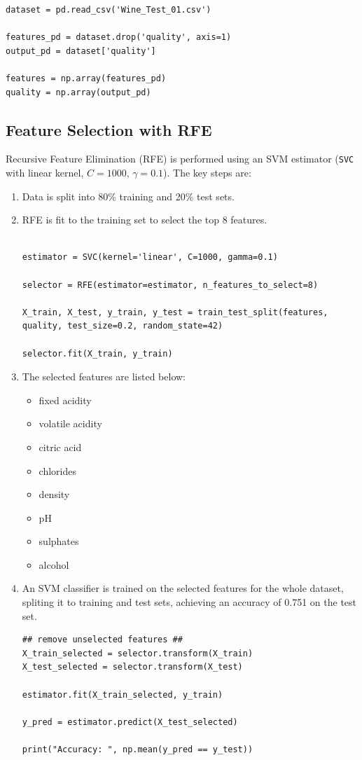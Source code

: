 \begin{lstlisting}
dataset = pd.read_csv('Wine_Test_01.csv')

features_pd = dataset.drop('quality', axis=1) 
output_pd = dataset['quality']

features = np.array(features_pd)
quality = np.array(output_pd)
\end{lstlisting}

\subsection{Feature Selection with RFE}

Recursive Feature Elimination (RFE) is performed using an SVM estimator (\texttt{SVC} with linear kernel, $C=1000$, $\gamma=0.1$). The key steps are:
\begin{enumerate}
    \item Data is split into 80\% training and 20\% test sets.
    \item RFE is fit to the training set to select the top 8 features.
    \begin{lstlisting}

estimator = SVC(kernel='linear', C=1000, gamma=0.1)

selector = RFE(estimator=estimator, n_features_to_select=8) 

X_train, X_test, y_train, y_test = train_test_split(features, quality, test_size=0.2, random_state=42)

selector.fit(X_train, y_train)
    \end{lstlisting}
    \newpage
    \item The selected features are listed below:
    \begin{itemize}
        \item fixed acidity
        \item volatile acidity
        \item citric acid
        \item chlorides
        \item density
        \item pH
        \item sulphates
        \item alcohol
    \end{itemize}
    \item An SVM classifier is trained on the selected features for the whole dataset, spliting it to training and test sets, achieving an accuracy of 0.751 on the test set.
    \begin{lstlisting}
## remove unselected features ##
X_train_selected = selector.transform(X_train)
X_test_selected = selector.transform(X_test)

estimator.fit(X_train_selected, y_train)

y_pred = estimator.predict(X_test_selected)

print("Accuracy: ", np.mean(y_pred == y_test))
    \end{lstlisting}
\end{enumerate}

